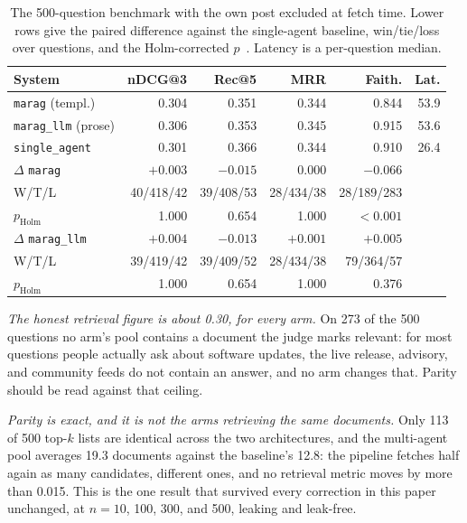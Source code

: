 \documentclass[10pt,conference]{IEEEtran}
\begin{document}
\begin{table}[t]
\caption{The 500-question benchmark with the own post excluded at fetch time.
Lower rows give the paired difference against the single-agent baseline,
win/tie/loss over questions, and the Holm-corrected $p$~\cite{holm1979}. Latency is
a per-question median.}
\label{tab:clean}
\centering
\footnotesize
\setlength{\tabcolsep}{3pt}
\begin{tabular}{@{}lrrrrr@{}}
\toprule
System & nDCG@3 & Rec@5 & MRR & Faith. & Lat. \\
\midrule
\texttt{marag} (templ.) & 0.304 & 0.351 & 0.344 & 0.844 & 53.9 \\
\texttt{marag\_llm} (prose) & 0.306 & 0.353 & 0.345 & 0.915 & 53.6 \\
\texttt{single\_agent} & 0.301 & 0.366 & 0.344 & 0.910 & 26.4 \\
\midrule
$\Delta$ \texttt{marag} & $+0.003$ & $-0.015$ & $0.000$ & $\mathbf{-0.066}$ & \\
\quad W/T/L & 40/418/42 & 39/408/53 & 28/434/38 & 28/189/283 & \\
\quad $p_{\mathrm{Holm}}$ & 1.000 & 0.654 & 1.000 & $\mathbf{<}\mathbf{0.001}$ & \\
$\Delta$ \texttt{marag\_llm} & $+0.004$ & $-0.013$ & $+0.001$ & $+0.005$ & \\
\quad W/T/L & 39/419/42 & 39/409/52 & 28/434/38 & 79/364/57 & \\
\quad $p_{\mathrm{Holm}}$ & 1.000 & 0.654 & 1.000 & 0.376 & \\
\bottomrule
\end{tabular}
\end{table}

\emph{The honest retrieval figure is about 0.30, for every arm.} On 273 of the 500
questions no arm's pool contains a document the judge marks relevant: for most
questions people actually ask about software updates, the live release, advisory,
and community feeds do not contain an answer, and no arm changes that. Parity
should be read against that ceiling.

\emph{Parity is exact, and it is not the arms retrieving the same documents.} Only
113 of 500 top-$k$ lists are identical across the two architectures, and the
multi-agent pool averages 19.3 documents against the baseline's 12.8: the pipeline
fetches half again as many candidates, different ones, and no retrieval metric
moves by more than 0.015. This is the one result that survived every correction in
this paper unchanged, at $n=10$, 100, 300, and 500, leaking and leak-free.
\end{document}
